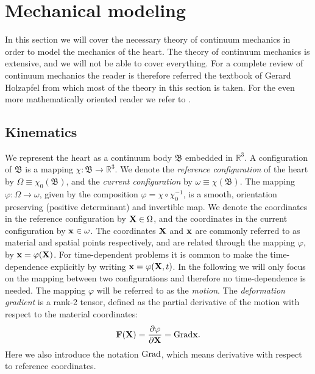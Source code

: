 \section{Mechanical modeling}
\label{sec:intro_mechanical}

In this section we will cover the necessary theory of continuum
mechanics in order to model the mechanics of the heart. The theory of
continuum mechanics is extensive, and we will not be able to cover
everything. For a complete review of continuum mechanics the reader is
therefore referred the textbook of Gerard Holzapfel
\cite{holzapfel2000nonlinear} from which most of the theory in this
section is taken. For the even more mathematically oriented reader we
refer to \cite{marsden1994mathematical}.

\subsection{Kinematics}
We represent the heart as a continuum body $\mathfrak{B}$ embedded in
$\mathbb{R}^3$. A configuration of $\mathfrak{B}$ is a mapping $\chi:
\mathfrak{B} \rightarrow \mathbb{R}^3$. 
We denote the \emph{reference configuration} of the heart by $\Omega
\equiv \chi_0(\mathfrak{B})$, and the \emph{current configuration} by $\omega
\equiv \chi(\mathfrak{B})$. The mapping $\varphi :  \Omega
\rightarrow \omega$, given by the composition $\varphi = \chi
\circ \chi_0^{-1}$, is a smooth, orientation preserving (positive
determinant) and invertible map. We denote the coordinates in the
reference configuration by $\mathbf{X} \in \Omega$, and the coordinates in the current
configuration by $\mathbf{x} \in \omega$. The coordinates $\mathbf{X}$ and $\mathbf{x}$ are
commonly referred to as material and spatial points respectively, and
are related through the mapping $\varphi$, by $\mathbf{x} = \varphi(\mathbf{X})$.
For time-dependent problems it is common to make  the time-dependence
explicitly by writing $\mathbf{x} = \varphi(\mathbf{X}, t)$. In the following
we will only focus on the mapping between two configurations and
therefore no time-dependence is needed. The mapping $\varphi$ will be
referred to as the \emph{motion}. The \emph{deformation gradient} is a
rank-2 tensor, defined as the partial derivative of the motion with
respect to the material coordinates:
\begin{align}
  \mathbf{F}(\mathbf{X}) = \frac{\partial \varphi}{\partial \mathbf{X}} = \mathrm{Grad} \mathbf{x}.
  \label{eq:deformation_gradient}
\end{align}
Here we also introduce the notation $\mathrm{Grad}$, which means derivative
with respect to reference coordinates.
